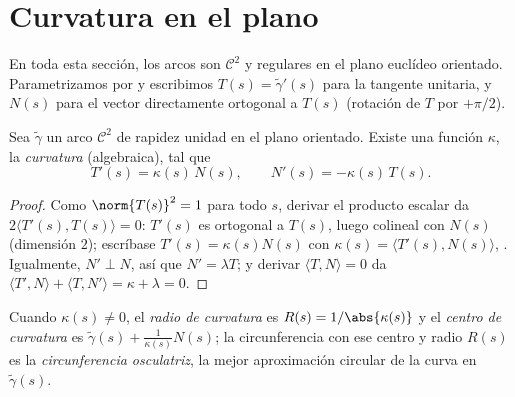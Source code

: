\section{Curvatura en el plano}

En toda esta sección, los arcos son $\mathcal{C}^2$ y regulares en el
plano euclídeo orientado. Parametrizamos por  y
escribimos $T(s) = \tilde\gamma'(s)$ para la tangente unitaria, y
$N(s)$ para el vector  directamente ortogonal a $T(s)$
(rotación de $T$ por $+\pi/2$).

\begin{theorem}\label{thm:b2:curves:frenet2d}
Sea $\tilde\gamma$ un arco $\mathcal{C}^2$ de rapidez unidad en el
plano orientado. Existe una función  $\kappa$, la
\emph{curvatura} (algebraica), tal que
\[
T'(s) = \kappa(s)\, N(s),
\qquad
N'(s) = -\kappa(s)\, T(s).
\]
\end{theorem}

\begin{proof}
Como $\norm{T(s)}^2 = 1$ para todo $s$, derivar el producto escalar
da $2\langle T'(s), T(s)\rangle = 0$: $T'(s)$ es ortogonal a $T(s)$,
luego colineal con $N(s)$ (dimensión $2$); escríbase $T'(s) =
\kappa(s) N(s)$ con $\kappa(s) = \langle T'(s), N(s)\rangle$,
. Igualmente, $N' \perp N$, así que $N' = \lambda T$; y
derivar $\langle T, N\rangle = 0$ da $\langle T', N\rangle + \langle
T, N'\rangle = \kappa + \lambda = 0$.
\end{proof}

\begin{definition}\label{def:b2:curves:curvature}
Cuando $\kappa(s) \neq 0$, el \emph{radio de curvatura} es $R(s) = 1/\abs{\kappa(s)}$ y el \emph{centro de
curvatura} es $\tilde\gamma(s) +
\frac{1}{\kappa(s)} N(s)$; la circunferencia con ese centro y radio
$R(s)$ es la \emph{circunferencia osculatriz}, la mejor aproximación circular de la curva en
$\tilde\gamma(s)$.
\end{definition}

